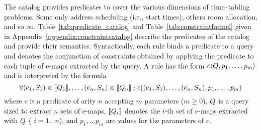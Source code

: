 The \UTP{} catalog provides predicates to cover the various dimensions of time--tabling problems.
Some only address scheduling (i.e., start times),
others room allocation, and so on.
Table~\ref{tab:predicate_catalog} and Table~\ref{tab:constraintformel} given in Appendix~\ref{appendix:constraintcatalog} describe the predicates of the catalog and provide their semantics.
Syntactically, each rule binds a predicate to a query
and denotes the conjunction of constraints obtained 
by applying the predicate to
each tuple of e-maps extracted by the query.
A %
rule has the form %
$c\langle{Q},p_1,\ldots,p_m\rangle$
and is interpreted by %
the %
formula
\begin{equation*}
\forall (e_1,S_1)\in\llbracket Q_1\rrbracket,\ldots,(e_n,S_n)\in\llbracket Q_{n}\rrbracket: c((e_1,S_1),\ldots,(e_n,S_n),p_1,\ldots,p_m)
\end{equation*}
where 
$c$ is a predicate of arity $n$ accepting $m$ parameters ($m\geq0$),
$Q$ is a query sized to extract $n$ sets of e-maps,
$\llbracket Q_i\rrbracket$
denotes the $i$-th set of e-maps extracted with $Q$
 (%
$i=1\ldots n$),
and
$p_1,\ldots p_m$ are values for the parameters of $c$.




